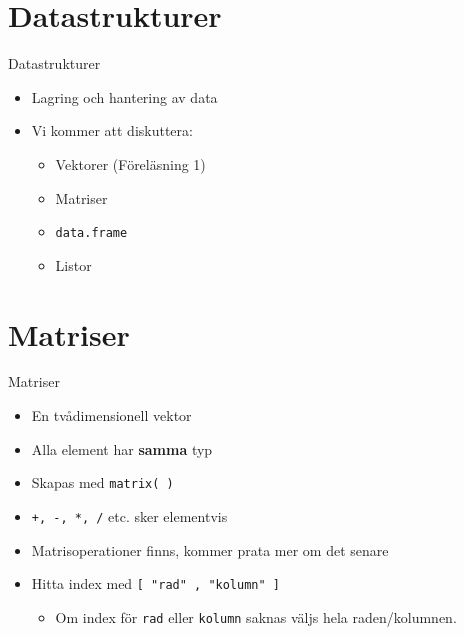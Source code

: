 \documentclass[
  11pt,
  ignorenonframetext,
]{beamer}
\providecommand{\tightlist}{%
  \setlength{\itemsep}{0pt}\setlength{\parskip}{0pt}}
\newcommand\imp[1]{\alert{\textbf{#1}}}
\begin{document}
\hypertarget{datastrukturer}{%
\section{Datastrukturer}\label{datastrukturer}}


\begin{frame}{Datastrukturer}
\protect\hypertarget{datastrukturer-1}{}
\begin{itemize}
\tightlist
\item
  Lagring och hantering av data
\item
  Vi kommer att diskuttera:

  \begin{itemize}
  \tightlist
  \item
    Vektorer (Föreläsning 1)
  \item
    Matriser
  \item
    \texttt{data.frame}
  \item
    Listor
  \end{itemize}
\end{itemize}
\end{frame}

\hypertarget{matriser}{%
\section{Matriser}\label{matriser}}


\begin{frame}{Matriser}
\protect\hypertarget{matriser-1}{}
\begin{itemize}
\tightlist
\item
  En tvådimensionell vektor
\item
  Alla element har \imp{samma} typ
\item
  Skapas med \texttt{matrix( )}
\item
  \texttt{+, -, *, /} etc. sker elementvis
\item
  Matrisoperationer finns, kommer prata mer om det senare
\item
  Hitta index med \texttt{[ "rad" , "kolumn" ]}

  \begin{itemize}
  \tightlist
  \item
    Om index för \texttt{rad} eller \texttt{kolumn} saknas väljs hela
    raden/kolumnen.
  \end{itemize}
\end{itemize}
\end{frame}
\end{document}
